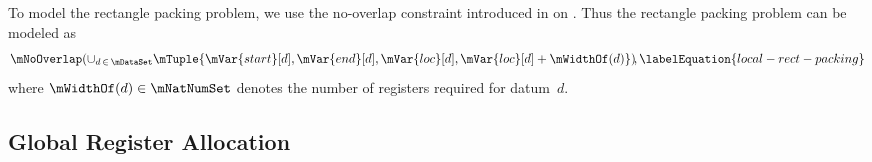 To model the rectangle packing problem, we use the \gls{no-overlap constraint}
introduced in  on
.
%
Thus the rectangle packing problem can be modeled as
%
\begin{equation}
  \mNoOverlap\!
  \left(
    \cup_{d \,\in\, \mDataSet}
      \mTuple{
         \mVar{start}[d],
         \mVar{end}[d],
         \mVar{loc}[d],
         \mVar{loc}[d] + \mWidthOf(d)
      }
  \right)\!\!,
  \labelEquation{local-rect-packing}
\end{equation}
%
where \mbox{$\mWidthOf(d) \in \mNatNumSet$} denotes the number of
\glspl{register} required for \gls{datum}~$d$\hspace{-.8pt}.


\subsection{Global Register Allocation}


